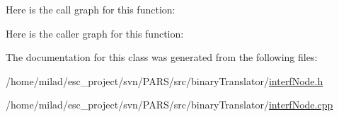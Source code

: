 Here is the call graph for this function:




Here is the caller graph for this function:




The documentation for this class was generated from the following files:\begin{DoxyCompactItemize}
\item 
/home/milad/esc\_\-project/svn/PARS/src/binaryTranslator/\hyperlink{interfNode_8h}{interfNode.h}\item 
/home/milad/esc\_\-project/svn/PARS/src/binaryTranslator/\hyperlink{interfNode_8cpp}{interfNode.cpp}\end{DoxyCompactItemize}
